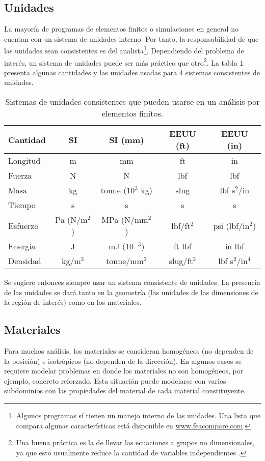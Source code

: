 \subsection{Unidades}
La mayoría de programas de elementos finitos o simulaciones en general no 
cuentan con un sistema de unidades interno. Por tanto, la responsabilidad de 
que las unidades sean consistentes es del analista\footnote{Algunos programas 
sí tienen un manejo interno de las unidades. Una lista que compara algunas 
características está disponible en \url{www.feacompare.com}.}. Dependiendo del 
problema de interés, un sistema de unidades puede ser más práctico que 
otro\footnote{Una buena práctica es la de llevar las ecuaciones a grupos no 
dimensionales, ya que esto usualmente reduce la cantidad de variables 
independientes \cite{book:langtangen2016scaling}.}. La tabla
\ref{tab:sistema_unidades} presenta algunas cantidades y las unidades usadas 
para 4 sistemas consistentes de unidades.
\begin{table}[H]
\centering
\begin{tabular}{lcccc}
\hline 
\textbf{Cantidad} & \textbf{SI} & \textbf{SI (mm)} & \textbf{EEUU (ft)} & \textbf{EEUU (in)} \\ 
\hline 
Longitud & m & mm & ft & in \\ 
Fuerza & N & N & lbf & lbf \\ 
Masa & kg & tonne (10$^3$ kg) & slug & lbf s$^2$/in \\ 
Tiempo & s & s & s & s \\ 
Esfuerzo & Pa (N/m$^2$) & MPa (N/mm$^2$) & lbf/ft$^2$ & psi (lbf/in$^2$) \\ 
Energía & J & mJ (10$^{-3}$) & ft lbf & in lbf \\ 
Densidad & kg/m$^3$ & tonne/mm$^3$ & slug/ft$^3$ & lbf s$^2$/in$^4$ \\ 
\hline 
\end{tabular}
\caption{Sistemas de unidades consistentes que pueden usarse en un análisis por elementos finitos.}
\label{tab:sistema_unidades}
\end{table}

Se sugiere entonces siempre usar un sistema consistente de unidades. La presencia de las unidades se dará tanto en la geometría (las unidades de las dimensiones de la región de interés) como en los materiales.

\subsection{Materiales}
Para muchos análisis, los materiales se consideran homogéneos (no dependen de la posición) e isotrópicos (no dependen de la dirección). En algunos casos se requiere  modelar problemas en donde los materiales no son homogéneos, por ejemplo, concreto reforzado. Esta situación puede modelarse con varios subdominios con las propiedades del material de cada material constituyente.

